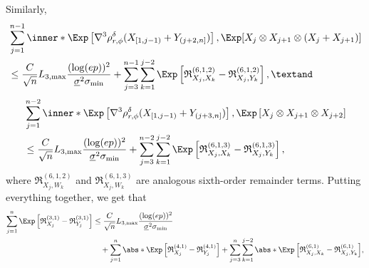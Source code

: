 \documentclass[aos]{imsart}
\begin{document}
Similarly,
\begin{equation*}
\begin{aligned}
    & \sum_{j=1}^{n-1} \inner*{ 
        \Exp\left[ \nabla^3 \rho_{r,\phi}^\delta(X_{[1,j-1)} + Y_{(j+2,n]}) \right], 
        \Exp[ X_{j} \otimes X_{j+1} \otimes (X_j + X_{j+1})] 
    } \\
    & \leq \frac{C}{\sqrt{n}} L_{3,\max} \frac{(\log(ep))^2}{\underline\sigma^2 \sigma_{\min}}
    + \sum_{j=3}^{n-1} \sum_{k=1}^{j-2} \Exp \left[ 
        \mathfrak{R}_{X_j,X_k}^{(6,1,2)}
        - \mathfrak{R}_{X_j,Y_k}^{(6,1,2)}
    \right], \textand
\end{aligned}
\end{equation*}
\begin{equation*}
\begin{aligned}
    & \sum_{j=1}^{n-2} \inner*{ 
        \Exp\left[ \nabla^3 \rho_{r,\phi}^\delta(X_{[1,j-1)} + Y_{(j+3,n]}) \right], 
        \Exp\left[ X_{j} \otimes X_{j+1} \otimes X_{j+2} \right]
    } \\
    & \leq \frac{C}{\sqrt{n}} L_{3,\max} \frac{(\log(ep))^2}{\underline\sigma^2 \sigma_{\min}}
    + \sum_{j=3}^{n-2} \sum_{k=1}^{j-2} \Exp \left[ 
        \mathfrak{R}_{X_j,X_k}^{(6,1,3)}
        - \mathfrak{R}_{X_j,Y_k}^{(6,1,3)}
    \right],
\end{aligned}
\end{equation*}
where $\mathfrak{R}_{X_j,W_k}^{(6,1,2)}$ and $\mathfrak{R}_{X_j,W_k}^{(6,1,3)}$ are analogous sixth-order remainder terms.
Putting everything together, we get that
\begin{equation} \label{eq:decompose_third_result_N}
\begin{aligned}
    \sum_{j=1}^{n} \Exp \left[  
        \mathfrak{R}_{X_j}^{(3,1)} 
        - \mathfrak{R}_{Y_j}^{(3,1)} 
    \right]
    & \leq \frac{C}{\sqrt{n}} L_{3,\max} \frac{(\log(ep))^2}{\underline\sigma^2 \sigma_{\min}} \\
    & \quad + \sum_{j=1}^{n} \abs*{ \Exp \left[ \mathfrak{R}_{X_j}^{(4,1)} 
        - \mathfrak{R}_{Y_j}^{(4,1)} \right] }
    + \sum_{j=3}^{n} \sum_{k=1}^{j-2} \abs*{ \Exp \left[ 
        \mathfrak{R}_{X_j,X_k}^{(6,1)}
        - \mathfrak{R}_{X_j,Y_k}^{(6,1)}
    \right] },
\end{aligned}
\end{equation}
\end{document}
